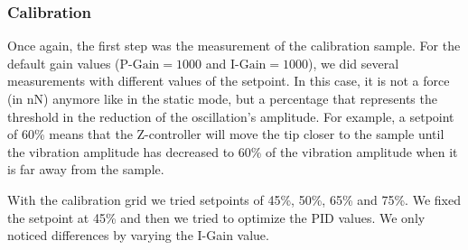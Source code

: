 \documentclass[11pt,a4paper]{article}
\begin{document}
\subsubsection{Calibration}
Once again, the first step was the measurement of the calibration sample. For the default gain values ($\text{P-Gain}=1000$ and $\text{I-Gain}=1000$), we did several measurements with different values of the setpoint. In this case, it is not a force (in \si{\nano N}) anymore like in the static mode, but a percentage that represents the threshold in the reduction of the oscillation's amplitude. For example, a setpoint of 60\% means that the Z-controller will move the tip closer to the sample until the vibration amplitude has decreased to 60\% of the vibration amplitude when it is far away from the sample.

With the calibration grid we tried setpoints of 45\%, 50\%, 65\% and 75\%. We fixed the setpoint at 45\% and then we tried to optimize the PID values. We only noticed differences by varying the I-Gain value.
\end{document}
